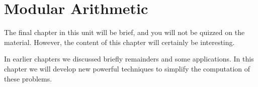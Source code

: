 \documentclass[a4paper,10pt]{report}
\begin{document}
\chapter{Modular Arithmetic}

The final chapter in this unit will be brief, and you will not be quizzed on the
material. However, the content of this chapter will certainly be interesting.

In earlier chapters we discussed briefly remainders and some applications. In
this chapter we will develop new powerful techniques to simplify the computation
of these problems.
\end{document}
